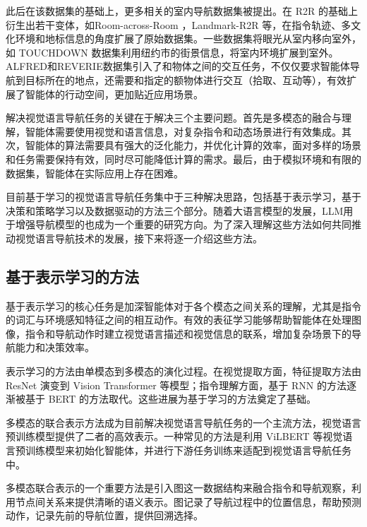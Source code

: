 \documentclass[bachelor]{thesis-uestc}
\begin{document}
此后在该数据集的基础上，更多相关的室内导航数据集被提出。在 R2R 的基础上衍生出若干变体，如Room-across-Room \cite{ku2020roomacrossroom}，Landmark-R2R \cite{heLandmarkRxRSolvingVisionandLanguage2021}等，在指令轨迹、多文化环境和地标信息的角度扩展了原始数据集。一些数据集将眼光从室内移向室外，如 TOUCHDOWN 数据集\cite{chenTOUCHDOWNNaturalLanguage2019}利用纽约市的街景信息，将室内环境扩展到室外。ALFRED\cite{shridharALFREDBenchmarkInterpreting2020}和REVERIE\cite{qiREVERIERemoteEmbodied2020}数据集引入了和物体之间的交互任务，不仅仅要求智能体导航到目标所在的地点，还需要和指定的额物体进行交互（拾取、互动等），有效扩展了智能体的行动空间，更加贴近应用场景。

解决视觉语言导航任务的关键在于解决三个主要问题。首先是多模态的融合与理解，智能体需要使用视觉和语言信息，对复杂指令和动态场景进行有效集成。其次，智能体的算法需要具有强大的泛化能力，并优化计算的效率，面对多样的场景和任务需要保持有效，同时尽可能降低计算的需求。最后，由于模拟环境和有限的数据集，智能体在实际应用上存在困难。

目前基于学习的视觉语言导航任务集中于三种解决思路，包括基于表示学习，基于决策和策略学习以及数据驱动的方法三个部分。随着大语言模型的发展，LLM用于增强导航模型的也成为一个重要的研究方向。为了深入理解这些方法如何共同推动视觉语言导航技术的发展，接下来将逐一介绍这些方法。

\subsection{基于表示学习的方法}
   基于表示学习的核心任务是加深智能体对于各个模态之间关系的理解，尤其是指令的词汇与环境感知特征之间的相互动作。有效的表征学习能够帮助智能体在处理图像，指令和导航动作时建立视觉语言描述和视觉信息的联系，增加复杂场景下的导航能力和决策效率。

   表示学习的方法由单模态到多模态的演化过程。在视觉提取方面，特征提取方法由 ResNet\cite{he2015deep} 演变到 Vision Transformer\cite{dosovitskiyImageWorth16x162021} 等模型；指令理解方面，基于 RNN\cite{Sherstinsky_2020} 的方法逐渐被基于 BERT\cite{devlinBERTPretrainingDeep2019} 的方法取代。这些进展为基于学习的方法奠定了基础。

   多模态的联合表示方法成为目前解决视觉语言导航任务的一个主流方法，视觉语言预训练模型提供了二者的高效表示。一种常见的方法是利用 ViLBERT 等视觉语言预训练模型来初始化智能体，并进行下游任务训练来适配到视觉语言导航任务中。

   多模态联合表示的一个重要方法是引入图这一数据结构来融合指令和导航观察，利用节点间关系来提供清晰的语义表示。图记录了导航过程中的位置信息，帮助预测动作，记录先前的导航位置，提供回溯选择。
\end{document}
